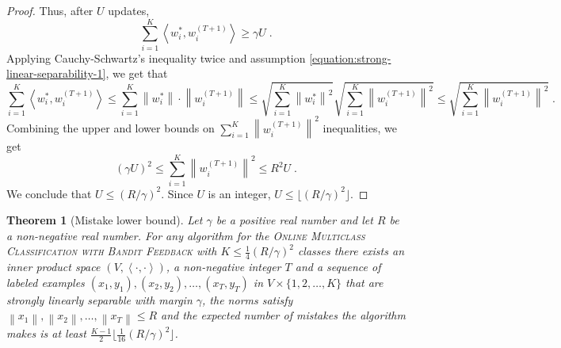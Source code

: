 \documentclass[12pt]{article}
\newtheorem{theorem}[definition]{Theorem}
\newcommand{\ip}[2]{\left\langle #1, #2 \right\rangle} %
\newcommand{\norm}[1]{\left\| #1 \right\|}  %
\begin{document}
\begin{proof}
Thus, after $U$ updates,
$$
\sum_{i=1}^K \ip{w_i^*}{w_i^{(T+1)}} \ge \gamma U \; .
$$
Applying Cauchy-Schwartz's inequality twice and assumption
\eqref{equation:strong-linear-separability-1}, we get that
$$
\sum_{i=1}^K \ip{w_i^*}{w_i^{(T+1)}}
\le \sum_{i=1}^K \norm{w_i^*} \cdot \norm{w_i^{(T+1)}}
\le \sqrt{\sum_{i=1}^K \norm{w_i^*}^2} \sqrt{\sum_{i=1}^K \norm{w_i^{(T+1)}}^2}
\le \sqrt{\sum_{i=1}^K \norm{w_i^{(T+1)}}^2} \; .
$$
Combining the upper and lower bounds on $\sum_{i=1}^K \norm{w_i^{(T+1)}}^2$ inequalities, we get
$$
(\gamma U)^2 \le \sum_{i=1}^K \norm{w_i^{(T+1)}}^2 \le R^2 U \; .
$$
We conclude that $U \le (R/\gamma)^2$. Since $U$ is an integer, $U \le \lfloor (R/\gamma)^2 \rfloor$.
\end{proof}

\begin{theorem}[Mistake lower bound]
\label{theorem:strongly-separable-example-mistake-lower-bound}
Let $\gamma$ be a positive real number and let $R$ be a non-negative real
number. For any algorithm for the \textsc{Online Multiclass Classification with
Bandit Feedback} with $K \le \frac{1}{4}(R/\gamma)^2$ classes there exists an inner
product space $(V, \ip{\cdot}{\cdot})$, a non-negative integer $T$ and a
sequence of labeled examples $(x_1, y_1), (x_2, y_2), \dots, (x_T, y_T)$
in $V \times \{1,2,\dots,K\}$ that are strongly linearly separable with
margin $\gamma$, the norms satisfy $\norm{x_1}, \norm{x_2}, \dots, \norm{x_T}
\le R$ and the expected number of mistakes the algorithm makes is at least $\frac{K-1}{2}
\lfloor \frac{1}{16} (R/\gamma)^2 \rfloor$.
\end{theorem}
\end{document}
